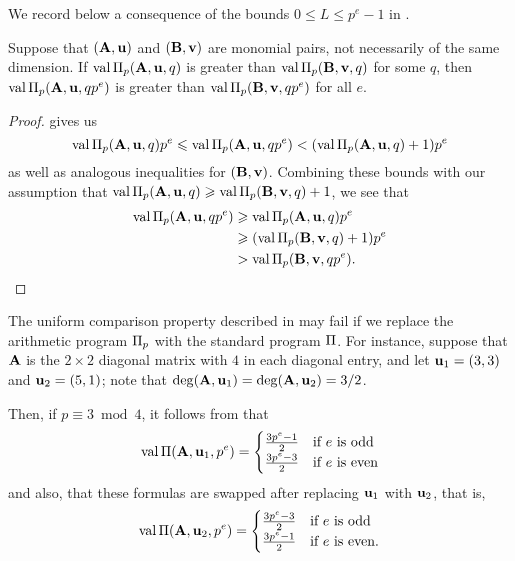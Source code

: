 \documentclass{amsart}
\begin{document}
We record below a consequence of the bounds $0 \le L \leq p^e-1$ in .

\begin{corollary}
   \label{cor: mu comparison}
   Suppose that $(\mathbf{A},\mathbf{u})$ and $(\mathbf{B},\mathbf{v})$ are monomial pairs, not necessarily of the same dimension.
   If $\operatorname{val} \Pi_p(\mathbf{A}, \mathbf{u}, q)$ is greater than $\operatorname{val} \Pi_p(\mathbf{B}, \mathbf{v}, q)$ for some $q$, then $\operatorname{val} \Pi_p(\mathbf{A}, \mathbf{u}, qp^e)$ is greater than $\operatorname{val} \Pi_p(\mathbf{B}, \mathbf{v}, qp^e)$ for all $e$.
\end{corollary}

\begin{proof}
    gives us
   \[
      \operatorname{val} \Pi_p(\mathbf{A}, \mathbf{u},q)p^e \leqslant \operatorname{val} \Pi_p(\mathbf{A}, \mathbf{u}, qp^e) < (\operatorname{val} \Pi_p(\mathbf{A}, \mathbf{u}, q)+1)p^e
   \]
   as well as analogous inequalities for $(\mathbf{B},\mathbf{v})$.
   Combining these bounds with our assumption that $\operatorname{val} \Pi_p(\mathbf{A}, \mathbf{u}, q) \geqslant \operatorname{val} \Pi_p(\mathbf{B}, \mathbf{v}, q) + 1$, we see that
   \begin{align*}
     \operatorname{val} \Pi_p(\mathbf{A}, \mathbf{u}, qp^e)  &\geqslant \operatorname{val} \Pi_p(\mathbf{A}, \mathbf{u}, q)  p^e \\
                                  &\geqslant (\operatorname{val} \Pi_p(\mathbf{B}, \mathbf{v}, q)+1) p^e \\
                                  & > \operatorname{val} \Pi_p(\mathbf{B}, \mathbf{v}, qp^e). \qedhere
   \end{align*}
\end{proof}

\begin{example}
\label{max depends on p and e: E}  The uniform comparison property described in  may fail if we replace the arithmetic program $\Pi_p$ with the standard program $\Pi$.  For instance, suppose that $\mathbf{A}$ is the $2 \times 2$ diagonal matrix with $4$ in each diagonal entry, and let $\mathbf{u}_1=(3,3)$ and $\mathbf{u}_2=(5,1)$;  note that $\operatorname{deg}(\mathbf{A},\mathbf{u}_1) = \operatorname{deg}(\mathbf{A},\mathbf{u}_2) = 3/2$.

Then, if $p \equiv 3 \bmod 4$, it follows from   that
\[
\operatorname{val}\Pi(\mathbf{A}, \mathbf{u}_1, p^e) = \begin{cases}
\frac{3 p^e - 1}{2} & \text{if } e \text{ is odd} \\
\frac{3 p^e - 3}{2} & \text{if } e \text{ is even}
\end{cases}
\]
and also, that these formulas are swapped after replacing $\mathbf{u}_1$ with $\mathbf{u}_2$, that is, 
\[
\operatorname{val}\Pi(\mathbf{A}, \mathbf{u}_2, p^e) = \begin{cases}
\frac{3 p^e - 3}{2} & \text{if } e \text{ is odd} \\ 
\frac{3 p^e - 1}{2} & \text{if } e \text{ is even}.
\end{cases}
\]
\end{example}
\end{document}
